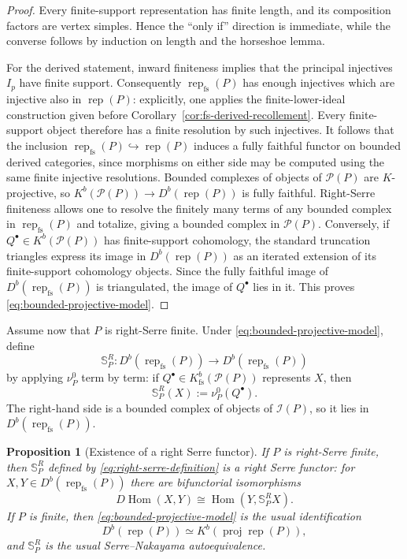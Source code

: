 \documentclass[12pt,reqno]{amsart}
\newtheorem{proposition}[theorem]{Proposition}
\theoremstyle{definition}
\theoremstyle{remark}
\newcommand{\Rep}{\operatorname{rep}}
\newcommand{\Hom}{\operatorname{Hom}}
\begin{document}
\begin{proof}
Every finite-support representation has finite length, and its composition
factors are vertex simples.  Hence the ``only if'' direction is immediate,
while the converse follows by induction on length and the horseshoe lemma.

For the derived statement, inward finiteness implies that the principal
injectives $I_p$ have finite support.  Consequently
$\Rep_{\mathrm{fs}}(P)$ has enough injectives which are injective also in
$\Rep(P)$: explicitly, one applies the finite-lower-ideal construction given
before Corollary~\ref{cor:fs-derived-recollement}.  Every finite-support object
therefore has a finite resolution by such injectives.  It follows that the
inclusion
$\Rep_{\mathrm{fs}}(P)\hookrightarrow\Rep(P)$ induces a fully faithful
functor on bounded derived categories, since morphisms on either side may be
computed using the same finite injective resolutions.  Bounded complexes of objects of
$\mathcal P(P)$ are $K$-projective, so
$K^b(\mathcal P(P))\to D^b(\Rep(P))$ is fully faithful.  Right-Serre
finiteness allows one to resolve the finitely many terms of any bounded
complex in $\Rep_{\mathrm{fs}}(P)$ and totalize, giving a bounded complex in
$\mathcal P(P)$.  Conversely, if $Q^\bullet\in K^b(\mathcal P(P))$ has
finite-support cohomology, the standard truncation triangles express its
image in $D^b(\Rep(P))$ as an iterated extension of its finite-support
cohomology objects.  Since the fully faithful image of
$D^b(\Rep_{\mathrm{fs}}(P))$ is triangulated, the image of $Q^\bullet$ lies
in it.  This proves \eqref{eq:bounded-projective-model}.
\end{proof}

Assume now that $P$ is right-Serre finite.  Under
\eqref{eq:bounded-projective-model}, define
\[
\mathbb S_P^R:
D^b(\Rep_{\mathrm{fs}}(P))
\longrightarrow
D^b(\Rep_{\mathrm{fs}}(P))
\]
by applying $\nu_P^0$ term by term: if $Q^\bullet\in
K^b_{\mathrm{fs}}(\mathcal P(P))$ represents $X$, then
\begin{equation}\label{eq:right-serre-definition}
\mathbb S_P^R(X):=\nu_P^0(Q^\bullet).
\end{equation}
The right-hand side is a bounded complex of objects of $\mathcal I(P)$, so it
lies in $D^b(\Rep_{\mathrm{fs}}(P))$.

\begin{proposition}[Existence of a right Serre functor]
\label{prop:right-serre-existence}
If $P$ is right-Serre finite, then $\mathbb S_P^R$ defined by
\eqref{eq:right-serre-definition} is a right Serre functor: for
$X,Y\in D^b(\Rep_{\mathrm{fs}}(P))$ there are bifunctorial isomorphisms
\[
D\Hom(X,Y)\cong\Hom(Y,\mathbb S_P^R X).
\]
If $P$ is finite, then \eqref{eq:bounded-projective-model} is the usual
identification
\[
D^b(\Rep(P))\simeq K^b(\operatorname{proj}\Rep(P)),
\]
and $\mathbb S_P^R$ is the usual Serre--Nakayama autoequivalence.
\end{proposition}
\end{document}
